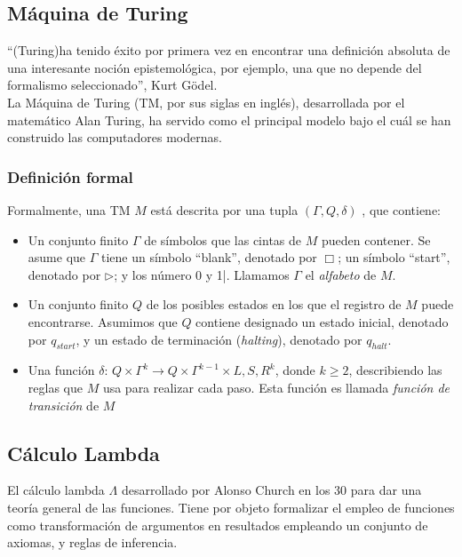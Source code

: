 \subsection{Máquina de Turing}

``(Turing)ha tenido éxito por primera vez en encontrar una definición absoluta de una interesante noción epistemológica, por ejemplo, una que no depende del formalismo seleccionado'', Kurt Gödel. \\

La Máquina de Turing (TM, por sus siglas en inglés), desarrollada por el matemático Alan Turing, ha servido como el principal modelo bajo el cuál se han construido las computadores modernas.

\subsubsection{Definición formal}

Formalmente, una TM $M$ está descrita por una tupla $(\Gamma, Q, \delta)$  \cite{Arora2009}, que contiene:

\begin{itemize}
\item Un conjunto finito $\Gamma$ de símbolos que las cintas de $M$ pueden contener. Se asume que $\Gamma$ tiene un símbolo ``blank'', denotado por $\Box$; un símbolo ``start'', denotado por $\rhd$; y los número 0 y 1|. Llamamos $\Gamma$ el \emph{alfabeto} de $M$.

\item Un conjunto finito $Q$ de los posibles estados en los que el registro de $M$ puede encontrarse. Asumimos que $Q$ contiene designado un estado inicial, denotado por $q_{start}$, y un estado de terminación (\emph{halting}), denotado por $q_{halt}$.

\item Una función $\delta$: $Q \times \Gamma^k \to Q \times \Gamma^{k-1} \times {L,S,R}^k$, donde $k \geq 2$, describiendo las reglas que $M$ usa para realizar cada paso. Esta función es llamada \emph{función de transición} de $M$
\end{itemize}



\subsection{Cálculo Lambda}

El cálculo lambda $\Lambda$ desarrollado por Alonso Church en los 30 para dar una teoría general de las funciones. Tiene por objeto formalizar el empleo de funciones como transformación de argumentos en resultados empleando 
un conjunto de axiomas, y reglas de inferencia.

